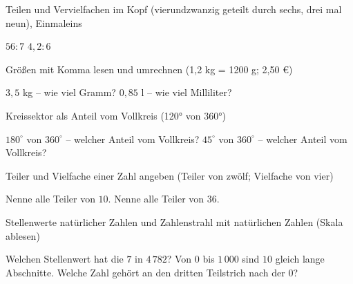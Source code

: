 \setcounter{aufgabe}{0}

\begin{aufgabe}{Teilen und Vervielfachen im Kopf (vierundzwanzig geteilt durch sechs, drei mal neun), Einmaleins}
\begin{teile}
\teil $56 : 7$
\teil $4{,}2 : 6$
\end{teile}
\end{aufgabe}

\begin{aufgabe}{Größen mit Komma lesen und umrechnen (1,2 kg = 1200 g; 2,50 €)}
\begin{teile}
\teil $3{,}5$ kg – wie viel Gramm? \leerfeld[g]
\teil $0{,}85$ l – wie viel Milliliter? \leerfeld[ml]
\end{teile}
\end{aufgabe}

\begin{aufgabe}{Kreissektor als Anteil vom Vollkreis (120° von 360°)}
\begin{teile}
\teil $180^\circ$ von $360^\circ$ – welcher Anteil vom Vollkreis?
\teil $45^\circ$ von $360^\circ$ – welcher Anteil vom Vollkreis?
\end{teile}
\end{aufgabe}

\begin{aufgabe}{Teiler und Vielfache einer Zahl angeben (Teiler von zwölf; Vielfache von vier)}
\begin{teile}
\teil Nenne alle Teiler von $10$.
\teil Nenne alle Teiler von $36$.
\end{teile}
\end{aufgabe}

\begin{aufgabe}{Stellenwerte natürlicher Zahlen und Zahlenstrahl mit natürlichen Zahlen (Skala ablesen)}
\begin{teile}
\teil Welchen Stellenwert hat die $7$ in $4\,782$?
\teil Von $0$ bis $1\,000$ sind $10$ gleich lange Abschnitte. Welche Zahl gehört an den dritten Teilstrich nach der $0$?
\end{teile}
\end{aufgabe}

